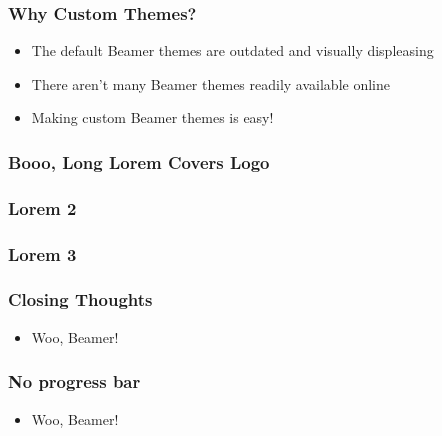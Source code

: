 \documentclass{beamer}
\begin{document}
		\begin{frame}
			\frametitle{Why Custom Themes?}
			\begin{itemize}
				\item The default Beamer themes are outdated and visually displeasing
				\item There aren't many Beamer themes readily available online
				\item Making custom Beamer themes is easy!
			\end{itemize}
		\end{frame}

		\begin{frame}
			\frametitle{Booo, Long Lorem Covers Logo}
			\blindtext
		\end{frame}

		\begin{frame}
			\frametitle{Lorem 2}
			\blindtext
		\end{frame}

		\begin{frame}
			\frametitle{Lorem 3}
			\blindtext
		\end{frame}

		\begin{frame}
			\frametitle{Closing Thoughts}
			\begin{itemize}
				\item Woo, Beamer!
			\end{itemize}
		\end{frame}
	
	\setcounter{showProgressBar}{0}
	\setcounter{showSlideNumbers}{0}		
	\setcounter{showSlideTotal}{0}
			\begin{frame}
				\frametitle{No progress bar}
				\begin{itemize}
					\item Woo, Beamer!
				\end{itemize}
			\end{frame}

	\setcounter{framenumber}{6}
\end{document}
